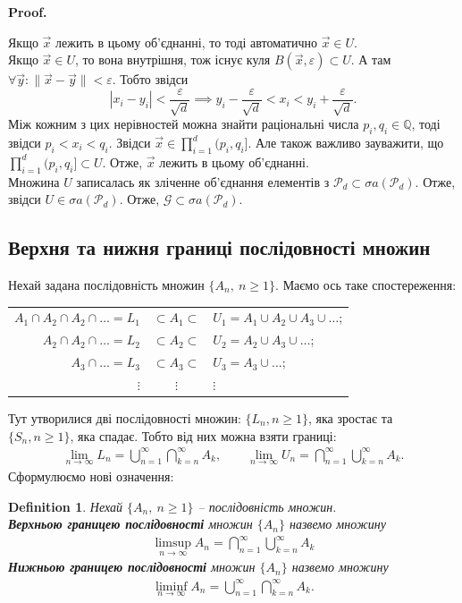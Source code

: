 \documentclass[a4paper, 10pt]{article}
\makeatletter
\theoremstyle{theoremdd}
\newtheorem{definition}[theorem]{Definition}
\renewenvironment{proof}[1][Proof.\\]{\par
\pushQED{\hfill \qed}%
\normalfont \topsep6\p@\@plus6\p@\relax
\trivlist
\item\relax
{\bfseries
#1\@addpunct{.}}\hspace\labelsep\ignorespaces
}{%
\popQED\endtrivlist\@endpefalse
}
\makeatother
\begin{document}
\begin{proof}
\[\]
Якщо $\vec{x}$ лежить в цьому об'єднанні, то тоді автоматично $\vec{x} \in U$.\\
Якщо $\vec{x} \in U$, то вона внутрішня, тож існує куля $B(\vec{x},\varepsilon) \subset U$. А там $\forall \vec{y}: \| \vec{x} - \vec{y} \| < \varepsilon$. Тобто звідси 
\[
|x_i-y_i| < \dfrac{\varepsilon}{\sqrt{d}} \implies y_i - \dfrac{\varepsilon}{\sqrt{d}} < x_i < y_i + \dfrac{\varepsilon}{\sqrt{d}}.
\] Між кожним з цих нерівностей можна знайти раціональні числа $p_i,q_i \in \mathbb{Q}$, тоді звідси $p_i < x_i < q_i$. Звідси $\vec{x} \in \displaystyle\prod_{i=1}^d (p_i,q_i]$. Але також важливо зауважити, що $\displaystyle\prod_{i=1}^d (p_i,q_i] \subset U$. Отже, $\vec{x}$ лежить в цьому об'єднанні.\\
Множина $U$ записалась як зліченне об'єднання елементів з $\mathcal{P}_d \subset \sigma a(\mathcal{P}_d)$. Отже, звідси $U \in \sigma a(\mathcal{P}_d)$. Отже, $\mathcal{G} \subset \sigma a(\mathcal{P}_d)$.
\end{proof}

\subsection{Верхня та нижня границі послідовності множин}
Нехай задана послідовність множин $\{A_n,\ n \geq 1\}$. Маємо ось таке спостереження:
\begin{center}
\begin{tabular}{rcl}
$A_1 \cap A_2 \cap A_2 \cap \dots = L_1$ & $\subset A_1 \subset$ & $U_1 = A_1 \cup A_2 \cup A_3 \cup \dots$; \\
$A_2 \cap A_2 \cap \dots = L_2$ & $\subset A_2 \subset$ & $U_2 = A_2 \cup A_3 \cup \dots$; \\
$A_3 \cap \dots = L_3$ & $\subset A_3 \subset$ & $U_3 = A_3 \cup \dots$; \\
$\vdots$ & $\vdots$ & $\vdots$
\end{tabular}
\end{center}
Тут утворилися дві послідовності множин: $\{ L_n, n \geq 1\}$, яка зростає та $\{S_n, n \geq 1\}$, яка спадає. Тобто від них можна взяти границі:
\begin{align*}
\lim_{n \to \infty} L_n = \displaystyle\bigcup_{n=1}^\infty \bigcap_{k=n}^{\infty} A_k, \qquad \lim_{n \to \infty} U_n = \displaystyle\bigcap_{n=1}^\infty \bigcup_{k=n}^{\infty} A_k.
\end{align*}
Сформулюємо нові означення:

\begin{definition}
Нехай $\{A_n,\ n \geq 1\}$ -- послідовність множин.\\
\textbf{Верхньою границею послідовності} множин $\{A_n\}$ назвемо множину
\begin{align*}
\limsup_{n \to \infty} A_n = \displaystyle\bigcap_{n=1}^\infty \bigcup_{k=n}^{\infty} A_k
\end{align*}
\textbf{Нижньою границею послідовності} множин $\{A_n\}$ назвемо множину
\begin{align*}
\liminf_{n \to \infty} A_n = \displaystyle\bigcup_{n=1}^\infty \bigcap_{k=n}^{\infty} A_k.
\end{align*}
\end{definition}
\end{document}
